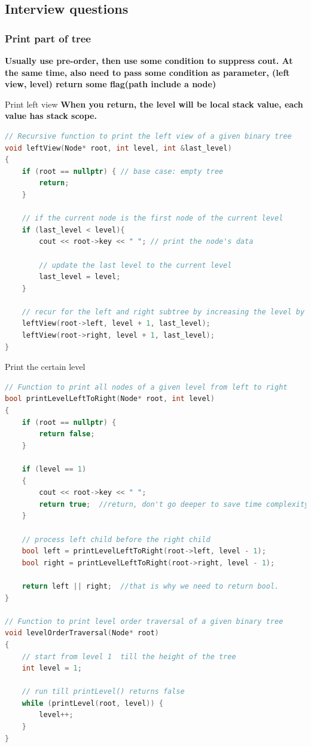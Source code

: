 \documentclass[a4paper,11pt,twoside]{book}
\begin{document}
\subsection{Interview questions}

\subsubsection{Print part of tree}

	\par \textbf{Usually use pre-order, then use some condition to suppress cout. At the same time, also need to pass some condition as parameter, (left view, level) return some flag(path include a node)}
	
	\par Print left view \textbf{When you return, the level will be local stack value, each value has stack scope.}

\begin{lstlisting}[frame=single, language=c++]
// Recursive function to print the left view of a given binary tree
void leftView(Node* root, int level, int &last_level)
{
	if (root == nullptr) { // base case: empty tree
		return;
	}
	
	// if the current node is the first node of the current level
	if (last_level < level){
		cout << root->key << " "; // print the node's data
		
		// update the last level to the current level
		last_level = level;
	}
	
	// recur for the left and right subtree by increasing the level by 1
	leftView(root->left, level + 1, last_level);
	leftView(root->right, level + 1, last_level);
}	
\end{lstlisting}	

	\par Print the certain level
\begin{lstlisting}[frame=single, language=c++]
// Function to print all nodes of a given level from left to right
bool printLevelLeftToRight(Node* root, int level)
{
	if (root == nullptr) {
		return false;
	}
	
	if (level == 1)
	{
		cout << root->key << " ";
		return true;  //return, don't go deeper to save time complexity.
	}
	
	// process left child before the right child
	bool left = printLevelLeftToRight(root->left, level - 1);
	bool right = printLevelLeftToRight(root->right, level - 1);
	
	return left || right;  //that is why we need to return bool. 
}

// Function to print level order traversal of a given binary tree
void levelOrderTraversal(Node* root)
{
	// start from level 1  till the height of the tree
	int level = 1;
	
	// run till printLevel() returns false
	while (printLevel(root, level)) {
		level++;
	}
}
\end{lstlisting}
\end{document}
